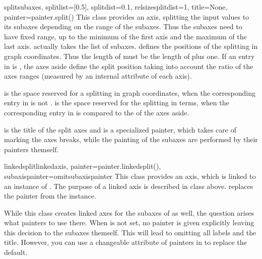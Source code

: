 \begin{classdesc}{split}{subaxes, splitlist=[0.5],
                         splitdist=0.1, relsizesplitdist=1,
                         title=None, painter=painter.split()}
  This class provides an axis, splitting the input values to its
  subaxes depending on the range of the subaxes. Thus the subaxes
  need to have fixed range, up to the minimum of the first axis and
  the maximum of the last axis.  actually takes the list
  of subaxes.  defines the positions of the splitting
  in graph coordinates. Thus the length of  must be the
  length of  plus one. If an entry in 
  is , the axes aside define the split position taking into
  account the ratio of the axes ranges (measured by an internal
   attribute of each axis).

   is the space reserved for a splitting in graph
  coordinates, when the corresponding entry in  is not
  .  is the space reserved for the
  splitting in terms, when the corresponding entry in 
  is  compared to the  of the axes aside.

   is the title of the split axes and  is a
  specialized painter, which takes care of marking the axes breaks,
  while the painting of the subaxes are performed by their painters
  themself.
\end{classdesc}

\begin{classdesc}{linkedsplit}{linkedaxis,
                               painter=painter.linkedsplit(),
                               subaxispainter=omitsubaxispainter}
  This class provides an axis, which is linked to an instance of
  . The purpose of a linked axis is described in class
   above.  replaces the painter from the
   instance.

  While this class creates linked axes for the subaxes of
   as well, the question arises what painters to use
  there. When  is not set, no painter is given
  explicitly leaving this decision to the subaxes themself. This will
  lead to omitting all labels and the title. However, you can use a
  changeable attribute of painters in  to replace
  the default.
\end{classdesc}

